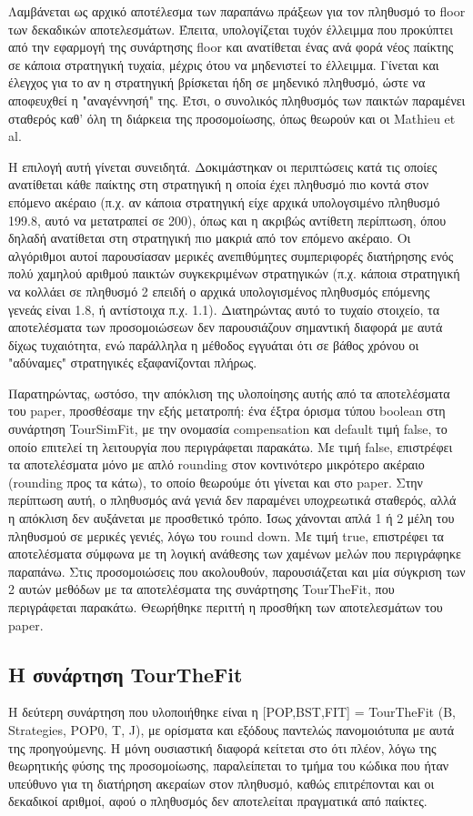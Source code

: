 \documentclass[12pt]{article}
\begin{document}
Λαμβάνεται ως αρχικό αποτέλεσμα των παραπάνω πράξεων για τον πληθυσμό το floor των δεκαδικών αποτελεσμάτων. Έπειτα, υπολογίζεται τυχόν έλλειμμα που προκύπτει από την εφαρμογή της συνάρτησης floor και ανατίθεται ένας ανά φορά νέος παίκτης σε κάποια στρατηγική τυχαία, μέχρις ότου να μηδενιστεί το έλλειμμα. Γίνεται και έλεγχος για το αν η στρατηγική βρίσκεται ήδη σε μηδενικό πληθυσμό, ώστε να αποφευχθεί η "αναγέννησή" της. Έτσι, ο συνολικός πληθυσμός των παικτών παραμένει σταθερός καθ' όλη τη διάρκεια της προσομοίωσης, όπως θεωρούν και οι Mathieu et al.

Η επιλογή αυτή γίνεται συνειδητά. Δοκιμάστηκαν οι περιπτώσεις κατά τις οποίες ανατίθεται κάθε παίκτης στη στρατηγική η οποία έχει πληθυσμό πιο κοντά στον επόμενο ακέραιο (π.χ. αν κάποια στρατηγική είχε αρχικά υπολογσιμένο πληθυσμό 199.8, αυτό να μετατραπεί σε 200), όπως και η ακριβώς αντίθετη περίπτωση, όπου δηλαδή ανατίθεται στη στρατηγική πιο μακριά από τον επόμενο ακέραιο. Οι αλγόριθμοι αυτοί παρουσίασαν μερικές ανεπιθύμητες συμπεριφορές διατήρησης ενός πολύ χαμηλού αριθμού παικτών συγκεκριμένων στρατηγικών (π.χ. κάποια στρατηγική να κολλάει σε πληθυσμό 2 επειδή ο αρχικά υπολογισμένος πληθυσμός επόμενης γενεάς είναι 1.8, ή αντίστοιχα π.χ. 1.1). Διατηρώντας αυτό το τυχαίο στοιχείο, τα αποτελέσματα των προσομοιώσεων δεν παρουσιάζουν σημαντική διαφορά με αυτά δίχως τυχαιότητα, ενώ παράλληλα η μέθοδος εγγυάται ότι σε βάθος χρόνου οι "αδύναμες" στρατηγικές εξαφανίζονται πλήρως.

Παρατηρώντας, ωστόσο, την απόκλιση της υλοποίησης αυτής από τα αποτελέσματα του paper, προσθέσαμε την εξής μετατροπή: ένα έξτρα όρισμα τύπου boolean στη συνάρτηση TourSimFit, με την ονομασία compensation και default τιμή false, το οποίο επιτελεί τη λειτουργία που περιγράφεται παρακάτω. Με τιμή false, επιστρέφει τα αποτελέσματα μόνο με απλό rounding στον κοντινότερο μικρότερο ακέραιο (rounding προς τα κάτω), το οποίο θεωρούμε ότι γίνεται και στο paper. Στην περίπτωση αυτή, ο πληθυσμός ανά γενιά δεν παραμένει υποχρεωτικά σταθερός, αλλά η απόκλιση δεν αυξάνεται με προσθετικό τρόπο. Ίσως χάνονται απλά 1 ή 2 μέλη του πληθυσμού σε μερικές γενιές, λόγω του round down. Με τιμή true,  επιστρέφει τα αποτελέσματα σύμφωνα με τη λογική ανάθεσης των χαμένων μελών που περιγράφηκε παραπάνω. Στις προσομοιώσεις που ακολουθούν, παρουσιάζεται και μία σύγκριση των 2 αυτών μεθόδων με τα αποτελέσματα της συνάρτησης TourTheFit, που περιγράφεται παρακάτω. Θεωρήθηκε περιττή η προσθήκη των αποτελεσμάτων του paper.

\subsection{Η συνάρτηση TourTheFit}
Η δεύτερη συνάρτηση που υλοποιήθηκε είναι η [POP,BST,FIT]\- =\- TourTheFit\- (B,\- Strategies,\- POP0,\- T,\- J), με ορίσματα και εξόδους παντελώς πανομοιότυπα με αυτά της προηγούμενης. Η μόνη ουσιαστική διαφορά κείτεται στο ότι πλέον, λόγω της θεωρητικής φύσης της προσομοίωσης, παραλείπεται το τμήμα του κώδικα που ήταν υπεύθυνο για τη διατήρηση ακεραίων στον πληθυσμό, καθώς επιτρέπονται και οι δεκαδικοί αριθμοί, αφού ο πληθυσμός δεν αποτελείται πραγματικά από παίκτες.
\end{document}
